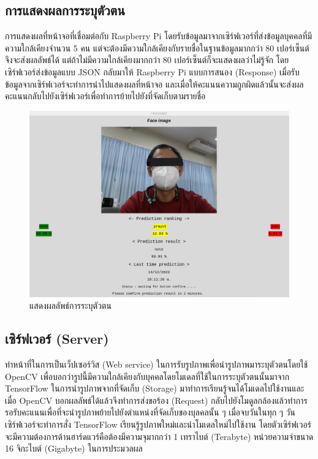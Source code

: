 \subsection{การแสดงผลการระบุตัวตน}
การแสดงผลที่หน้าจอที่เชื่อมต่อกับ Raspberry Pi โดยรับข้อมูลมาจากเซิร์ฟเวอร์ที่ส่งข้อมูลบุคคลที่มีความใกล้เคียงจำนวน 5 คน 
แต่จะต้องมีความใกล้เคียงกับรายชื่อในฐานข้อมูลมากกว่า 80 เปอร์เซ็นต์จึงจะส่งผลลัพธ์ได้ แต่ถ้าไม่มีความใกล้เคียงมากกว่า 80 เปอร์เซ็นต์ก็จะแสดงผลว่าไม่รู้จัก 
โดยเซิร์ฟเวอร์ส่งข้อมูลแบบ JSON กลับมาให้ Raspberry Pi แบบการสนอง (Response) เมื่อรับข้อมูลจากเซิร์ฟเวอร์จะทำการนำไปแสดงผลที่หน้าจอ 
และเมื่อให้คะแนนความถูกผิดแล้วนั้นจะส่งผลคะแนนกลับไปยังเซิร์ฟเวอร์เพื่อทำการย้ายไปยังที่จัดเก็บตามรายชื่อ \\

\begin{figure}[ht]
  \begin{center}
    \includegraphics[scale=.45]{pic/result_page_blind.png}
  \caption[แสดงผลลัพธ์การระบุตัวตน]{แสดงผลลัพธ์การระบุตัวตน}
  \end{center}
  \label{fig:predict_result}
\end{figure}
\newpage

\subsection{เซิร์ฟเวอร์ (Server)}
ทำหน้าที่ในการเป็นเว็ปเซอร์วิส (Web service) ในการรับรูปภาพเพื่อนำรูปภาพมาระบุตัวตนโดยใช้ OpenCV
เพื่อบอกว่ารูปนี้มีความใกล้เคียงกับบุคคลโดยโมเดลที่ใช้ในการระบุตัวตนนั้นมาจาก TensorFlow ในการนำรูปภาพจากที่จัดเก็บ (Storage) 
มาทำการเรียนรู้จนได้โมเดลไปใช้งานและเมื่อ OpenCV บอกผลลัพธ์ได้แล้วจึงทำการส่งขอร้อง (Request) 
กลับไปยังโมดูลกล้องแล้วทำการรอรับคะแนนเพื่อที่จะนำรูปภาพย้ายไปยังตำแหน่งที่จัดเก็บของบุลคลนั้น ๆ เมื่อจบวันในทุก ๆ 
วันเซิร์ฟเวอร์จะทำการสั่ง TensorFlow เรียนรู้รูปภาพใหม่และนำโมเดลใหม่ไปใช้งาน โดยตัวเซิร์ฟเวอร์จะมีความต้องการด้านฮาร์ดแวร์คือต้องมีความจุมากกว่า 1 เทราไบต์  (Terabyte) 
หน่วยความจำขนาด 16 จิกะไบต์ (Gigabyte) ในการประมวลผล

